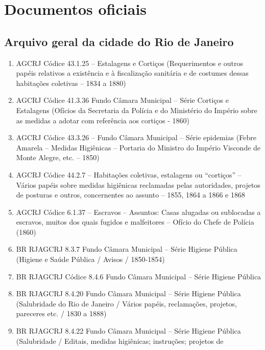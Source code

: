 \hypertarget{documentos-oficiais}{%
\section{Documentos oficiais}\label{documentos-oficiais}}

\hypertarget{arquivo-geral-da-cidade-do-rio-de-janeiro}{%
\subsection{Arquivo geral da cidade do Rio de
Janeiro}\label{arquivo-geral-da-cidade-do-rio-de-janeiro}}

\begin{enumerate}
\def\labelenumi{\arabic{enumi}.}
\item
  AGCRJ Códice 43.1.25 -- Estalagens e Cortiços (Requerimentos e outros
  papéis relativos a existência e à fiscalização sanitária e de costumes
  dessas habitações coletivas -- 1834 a 1880)
\item
  AGCRJ Códice 41.3.36 Fundo Câmara Municipal -- Série Cortiços e
  Estalagens (Ofícios da Secretaria da Polícia e do Ministério do
  Império sobre as medidas a adotar com referência aos cortiços - 1860)
\item
  AGCRJ Códice 43.3.26 -- Fundo Câmara Municipal -- Série epidemias
  (Febre Amarela -- Medidas Higiênicas -- Portaria do Ministro do
  Império Visconde de Monte Alegre, etc. -- 1850)
\item
  AGCRJ Códice 44.2.7 -- Habitações coletivas, estalagens ou
  ``cortiços'' -- Vários papéis sobre medidas higiênicas reclamadas
  pelas autoridades, projetos de posturas e outros, concernentes ao
  assunto -- 1855, 1864 a 1866 e 1868
\item
  AGCRJ Códice 6.1.37 -- Escravos -- Assuntos: Casas alugadas ou
  sublocadas a escravos, muitos dos quais fugidos e malfeitores --
  Ofício do Chefe de Polícia (1860)
\item
  BR RJAGCRJ 8.3.7 Fundo Câmara Municipal -- Série Higiene Pública
  (Higiene e Saúde Pública / Avisos / 1850-1854)
\item
  BR RJAGCRJ Códice 8.4.6 Fundo Câmara Municipal -- Série Higiene
  Pública
\item
  BR RJAGCRJ 8.4.20 Fundo Câmara Municipal -- Série Higiene Pública
  (Salubridade do Rio de Janeiro / Vários papéis, reclamações, projetos,
  pareceres etc. / 1830 a 1888)
\item
  BR RJAGCRJ 8.4.22 Fundo Câmara Municipal -- Série Higiene Pública
  (Salubridade / Editais, medidas higiênicas; instruções; projetos de

\end{enumerate}
